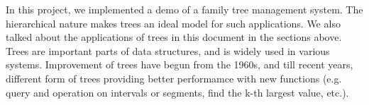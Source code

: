 \documentclass[cn,black,12pt,normal]{elegantnote}
\begin{document}
In this project, we implemented a demo of a family tree management system. The hierarchical nature makes trees an ideal model for such applications. We also talked about the applications of trees in this document in the sections above. Trees are important parts of data structures, and is widely used in various systems. Improvement of trees have begun from the 1960s, and till recent years, different form of trees providing better performamce with new functions (e.g. query and operation on intervals or segments, find the k-th largest value, etc.).

\newpage

\end{document}
